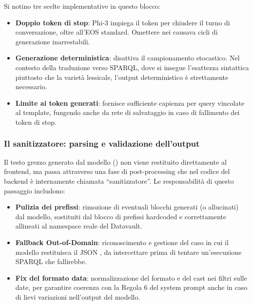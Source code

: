 \newpage

Si notino tre scelte implementative in questo blocco:

\begin{itemize}
  \item \textbf{Doppio token di stop}: Phi-3 impiega il token  per chiudere il turno di conversazione, oltre all'EOS standard. Omettere  nei  causava cicli di generazione inarrestabili.
  \item \textbf{Generazione deterministica}:  disattiva il campionamento stocastico. Nel contesto della traduzione verso SPARQL, dove si insegue l'esattezza sintattica piuttosto che la varietà lessicale, l'output deterministico è strettamente necessario.
  \item \textbf{Limite ai token generati}:  fornisce sufficiente capienza per query vincolate al template, fungendo anche da rete di salvataggio in caso di fallimento dei token di stop.
\end{itemize}

\subsubsection{Il sanitizzatore: parsing e validazione dell'output}

Il testo grezzo generato dal modello () non viene restituito direttamente al frontend, ma passa attraverso una fase di post-processing che nel codice del backend è internamente chiamata ``sanitizzatore''. Le responsabilità di questo passaggio includono:

\begin{itemize}
    \item \textbf{Pulizia dei prefissi}: rimozione di eventuali blocchi  generati (o allucinati) dal modello, sostituiti dal blocco di prefissi hardcoded e correttamente allineati al namespace reale del Datavault.
    \item \textbf{Fallback Out-of-Domain}: riconoscimento e gestione del caso in cui il modello restituisca il JSON , da intercettare prima di tentare un'esecuzione SPARQL che fallirebbe.
    \item \textbf{Fix del formato data}: normalizzazione del formato e del cast  nei filtri sulle date, per garantire coerenza con la Regola 6 del system prompt anche in caso di lievi variazioni nell'output del modello. %
\end{itemize}

